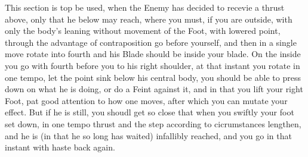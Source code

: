 
This section is top be used, when the Enemy has decided to recevie a
thrust above, only that he below may reach, where you must, if you are
outside, with only the body's leaning without movement of the Foot,
with lowered point, through the advantage of contraposition go before
yourself, and then in a single move rotate into fourth and his Blade
should be inside your blade. On the inside you go with fourth before
you to his right shoulder, at that instant you rotate in one tempo,
let the point sink below his central body, you should be able to press down on
what he is doing, or do a Feint against it, and in that you lift your
right Foot, pat good attention to how one moves, after which you can
mutate your effect. But if he is still, you shoudl get so close that
when you swiftly your foot set down, in one tempo thrust and the step
according to cicrumstances lengthen, and he is (in that he so long has
waited) infallibly reached, and you go in that instant with haste back
again.
